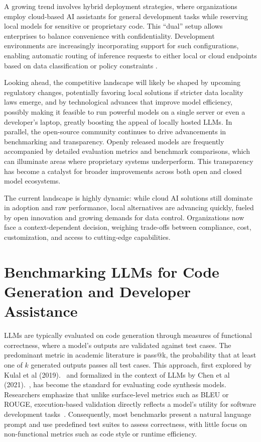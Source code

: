 A growing trend involves hybrid deployment strategies, where organizations employ cloud-based \gls{AI} assistants for general development tasks while reserving local models for sensitive or proprietary code. This ``dual'' setup allows enterprises to balance convenience with confidentiality. Development environments are increasingly incorporating support for such configurations, enabling automatic routing of inference requests to either local or cloud endpoints based on data classification or policy constraints \autocite{PALO}.

Looking ahead, the competitive landscape will likely be shaped by upcoming regulatory changes, potentially favoring local solutions if stricter data locality laws emerge, and by technological advances that improve model efficiency, possibly making it feasible to run powerful models on a single server or even a developer’s laptop, greatly boosting the appeal of locally hosted \glspl{LLM}. In parallel, the open-source community continues to drive advancements in benchmarking and transparency. Openly released models are frequently accompanied by detailed evaluation metrics and benchmark comparisons, which can illuminate areas where proprietary systems underperform. This transparency has become a catalyst for broader improvements across both open and closed model ecosystems.

The current landscape is highly dynamic: while cloud \gls{AI} solutions still dominate in adoption and raw performance, local alternatives are advancing quickly, fueled by open innovation and growing demands for data control. Organizations now face a context-dependent decision, weighing trade-offs between compliance, cost, customization, and access to cutting-edge capabilities.

\section{Benchmarking LLMs for Code Generation and Developer Assistance}
\label{sec:llm-benchmarks}
\glspl{LLM} are typically evaluated on code generation through measures of functional correctness, where a model's outputs are validated against test cases. The predominant metric in academic literature is pass@k, the probability that at least one of $k$ generated outputs passes all test cases. This approach, first explored by Kulal et al (2019).~\autocite{kulal2019spoc} and formalized in the context of \glspl{LLM} by Chen et al (2021).~\autocite{Chen2021}, has become the standard for evaluating code synthesis models. Researchers emphasize that unlike surface-level metrics such as BLEU or ROUGE, execution-based validation directly reflects a model's utility for software development tasks~\autocite{xu2022systematic}. Consequently, most benchmarks present a natural language prompt and use predefined test suites to assess correctness, with little focus on non-functional metrics such as code style or runtime efficiency.

